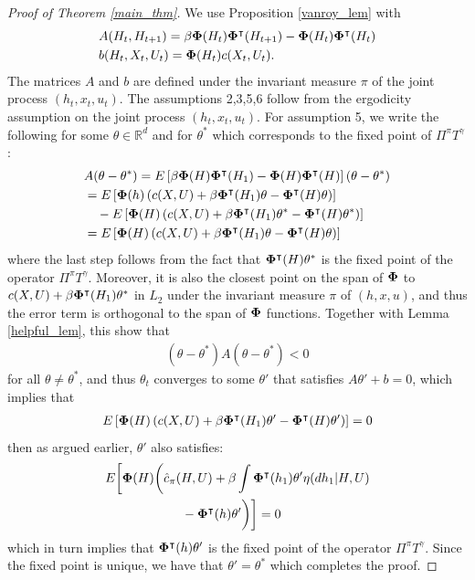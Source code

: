 \documentclass[letterpaper, 10 pt, conference]{ieeeconf}  %
\theoremstyle{definition}
\theoremstyle{remark}
\begin{document}
\begin{proof}[Proof of Theorem \ref{main_thm}]
We use Proposition \ref{vanroy_lem} with 
\begin{align*}
&A(H_t,H_{t+1})= \beta{\bf \Phi}(H_t){\bf \Phi}^\intercal(H_{t+1})- {\bf \Phi}(H_t){\bf \Phi}^\intercal(H_{t})\\
&b(H_t,X_t,U_t)={\bf \Phi}(H_t)c(X_t,U_t).
\end{align*}
The matrices $A$ and $b$ are defined under the invariant measure $\pi$ of the  joint process $(h_t,x_t,u_t)$. 
 The assumptions 2,3,5,6 follow from the ergodicity assumption on the joint process $(h_t,x_t,u_t)$. For assumption 5, we write the following for some $\theta\in\mathds{R}^d$ and for $\theta^*$ which corresponds to the fixed point of $\Pi^\pi T^\gamma$:
 \begin{align*}
 &A (\theta-\theta^*)=E\left[\beta {\bf \Phi}(H){\bf \Phi}^\intercal(H_{1})- {\bf \Phi}(H){\bf \Phi}^\intercal(H)  \right] (\theta-\theta^*)\\
 &= E\left[{\bf \Phi}(h)\left( c(X,U)+\beta {\bf \Phi}^\intercal(H_{1})\theta- {\bf \Phi}^\intercal(H)\theta \right) \right]\\
 & \quad - E\left[{\bf \Phi}(H)\left( c(X,U)+\beta {\bf \Phi}^\intercal(H_{1})\theta^*- {\bf \Phi}^\intercal(H)\theta^* \right) \right]\\
 &=E\left[{\bf \Phi}(H)\left( c(X,U)+\beta {\bf \Phi}^\intercal(H_{1})\theta- {\bf \Phi}^\intercal(H)\theta \right) \right]
 \end{align*}
 where the last step follows from the fact that ${\bf \Phi}^\intercal(H)\theta^*$ is the fixed point of the operator $\Pi^\pi T^\gamma$. Moreover, it is also the closest point on the span of ${\bf \Phi}$ to  $c(X,U)+\beta {\bf \Phi}^\intercal(H_{1})\theta^*$ in $L_2$ under the invariant measure $\pi$ of $(h,x,u)$, and thus the error term is orthogonal to the span of ${\bf \Phi}$ functions.  Together with Lemma \ref{helpful_lem}, this show that 
 \begin{align*}
 (\theta-\theta^*)A(\theta-\theta^*)<0
 \end{align*}
 for all $\theta\neq\theta^*$, and thus $\theta_t$ converges to some $\theta'$ that satisfies $A\theta'+b=0$, which implies that
 \begin{align*}
 E\left[{\bf \Phi}(H)\left( c(X,U)+\beta {\bf \Phi}^\intercal(H_{1})\theta'- {\bf \Phi}^\intercal(H)\theta' \right) \right]=0
 \end{align*}
 then as argued earlier, $\theta'$ also satisfies:
 \begin{align*}
 &E\bigg[{\bf \Phi}(H)\bigg( \hat{c}_\pi(H,U)+\beta \int{\bf \Phi}^\intercal(h_{1})\theta' \eta(dh_1|H,U)\\
 &\qquad\qquad\qquad- {\bf \Phi}^\intercal(h)\theta' \bigg) \bigg]=0
 \end{align*}
 which in turn implies that ${\bf \Phi}^\intercal(h)\theta' $ is the fixed point of the operator $\Pi^\pi T^\gamma$. Since the fixed point is unique, we have that $\theta'=\theta^*$ which completes the proof.
\end{proof}
\end{document}
